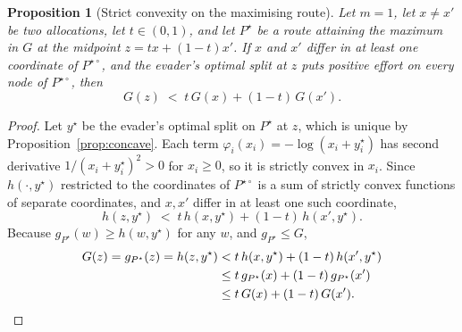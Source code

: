 \documentclass[11pt,a4paper]{article}
\theoremstyle{plain}
\newtheorem{proposition}[theorem]{Proposition}
\theoremstyle{definition}
\begin{document}
\begin{proposition}[Strict convexity on the maximising route]
\label{prop:partial-strict}
Let $m=1$, let $x\ne x'$ be two allocations, let $t\in(0,1)$, and let
$P^{\star}$ be a route attaining the maximum in $G$ at the midpoint
$z=tx+(1-t)x'$. If $x$ and $x'$ differ in at least one coordinate of
$P^{\star\circ}$, and the evader's optimal split at $z$ puts positive
effort on every node of $P^{\star\circ}$, then
\begin{equation}
  G(z)\;<\;t\,G(x)+(1-t)\,G(x').
\end{equation}
\end{proposition}
\begin{proof}
Let $y^{\star}$ be the evader's optimal split on $P^{\star}$ at $z$, which
is unique by Proposition~\ref{prop:concave}. Each term
$\varphi_i(x_i)=-\log(x_i+y^{\star}_i)$ has second derivative
$1/(x_i+y^{\star}_i)^2>0$ for $x_i\ge0$, so it is strictly convex in
$x_i$. Since $h(\cdot,y^{\star})$ restricted to the coordinates of
$P^{\star\circ}$ is a sum of strictly convex functions of separate
coordinates, and $x,x'$ differ in at least one such coordinate,
\begin{equation}
  h(z,y^{\star}) \;<\; t\,h(x,y^{\star})+(1-t)\,h(x',y^{\star}).
  \label{eq:step1}
\end{equation}
Because $g_{P^{\star}}(w)\ge h(w,y^{\star})$ for any $w$, and
$g_{P^{\star}}\le G$,
\begin{align}
  G(z)=g_{P^{\star}}(z)=h(z,y^{\star})
    &< t\,h(x,y^{\star})+(1-t)\,h(x',y^{\star}) \notag\\
    &\le t\,g_{P^{\star}}(x)+(1-t)\,g_{P^{\star}}(x') \notag\\
    &\le t\,G(x)+(1-t)\,G(x'). \qedhere
\end{align}
\end{proof}
\end{document}
